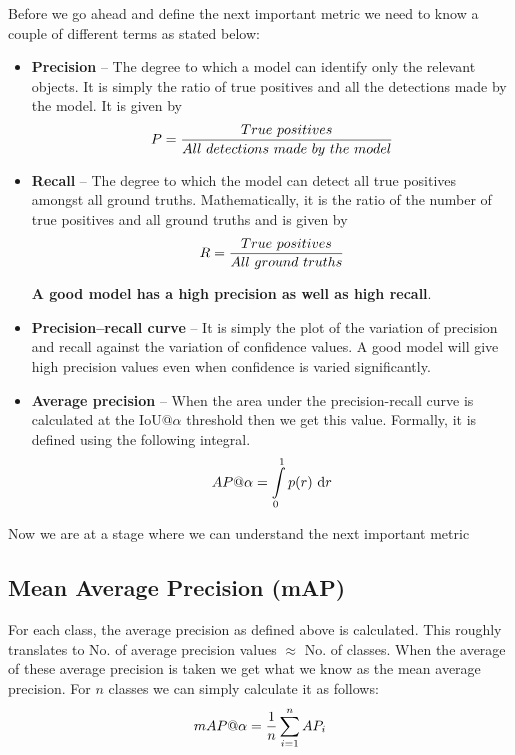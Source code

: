 Before we go ahead and define the next important metric we need to
know a couple of different terms as stated below:
\begin{itemize}
  \item \textbf{Precision} – The degree to which a model can identify
    only the relevant objects. It is simply the ratio of true
    positives and all the detections made by the model. It is given by
    \begin{equation}
      \centering
      P = \frac{True \ positives}{All \ detections \ made \ by \ the \ model}
    \end{equation}
  \item \textbf{Recall} – The degree to which the model can detect
    all true positives amongst all ground truths. Mathematically, it
    is the ratio of the number of true positives and all ground
    truths and is given by
    \begin{equation}
      \centering
      R = \frac{True \ positives}{All \ ground \ truths}
    \end{equation}

    \textbf{A good model has a high precision as well as high recall}.

  \item \textbf{Precision–recall curve} – It is simply the plot of
    the variation of precision and recall against the variation of
    confidence values. A good model will give high precision values
    even when confidence is varied significantly.
  \item \textbf{Average precision} – When the area under the
    precision-recall curve is calculated at the IoU@$\alpha$
    threshold then we get this value. Formally, it is defined using
    the following integral.
    \begin{equation}
      \centering
      AP@\alpha = \int\limits_{0}^{1} p(r) \ \mathrm{d} r
    \end{equation}

\end{itemize}

Now we are at a stage where we can understand the next important metric

\subsection{Mean Average Precision (mAP)}
For each class, the average precision as defined above is calculated.
This roughly translates to No. of average precision values $\approx$
No. of classes. When the average of these average precision is taken
we get what we know as the mean average precision. For $n$ classes we
can simply calculate it as follows:
\begin{equation}
  \centering
  mAP@\alpha = \frac{1}{n} \sum_{i=1}^{n} AP_{i}
\end{equation}

